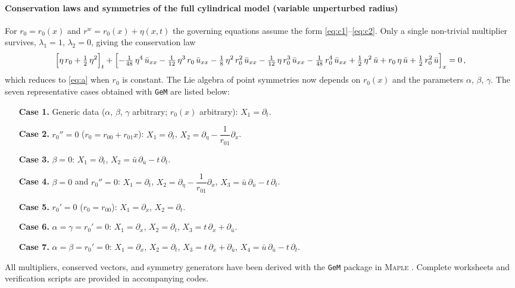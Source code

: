 \documentclass[alpha-refs, 12pt]{wiley-article}
\begin{document}
\paragraph{Conservation laws and symmetries of the full cylindrical model (variable unperturbed radius)}\label{par:variable_r0} For $r_{0}=r_{0}(x)$ and $r^{w}=r_{0}(x)+\eta(x,t)$ the governing equations assume the form \eqref{eq:c1}–\eqref{eq:c2}.  Only a single non-trivial multiplier survives, $\lambda_{1}=1$, $\lambda_{2}=0$, giving the conservation law
\begin{equation}
  \Bigl[\eta\,r_{0}+\tfrac12\,\eta^{2}\Bigr]_{t}
  +\Bigl[
        -\tfrac1{48}\,\eta^{4}\,\bar{u}_{xx}
        -\tfrac1{12}\,\eta^{3}\,r_{0}\,\bar{u}_{xx}
        -\tfrac18\,\eta^{2}\,r_{0}^{2}\,\bar{u}_{xx}
        -\tfrac1{12}\,\eta\,r_{0}^{3}\,\bar{u}_{xx}
        -\tfrac1{48}\,r_{0}^{4}\,\bar{u}_{xx}
        \\[2pt]
        +\tfrac12\,\eta^{2}\,\bar{u}
        +r_{0}\,\eta\,\bar{u}
        +\tfrac12\,r_{0}^{2}\,\bar{u}
  \Bigr]_{x}=0\,,
\end{equation}
which reduces to \eqref{eq:a} when $r_{0}$ is constant. The Lie algebra of point symmetries now depends on $r_{0}(x)$ and the parameters $\alpha$, $\beta$, $\gamma$. The seven representative cases obtained with \texttt{GeM} are listed below:
\begin{itemize}
  \item[\textbf{Case 1.}]
    Generic data ($\alpha$, $\beta$, $\gamma$ arbitrary; $r_{0}(x)$ arbitrary):\;
    $X_{1}=\partial_{t}$.
  \item[\textbf{Case 2.}]
    $r_{0}''=0$ ($r_{0}=r_{00}+r_{01}x$):\;
    $X_{1}=\partial_{t}$,\;
    $X_{2}=\partial_{\eta}-\dfrac{1}{r_{01}}\partial_{x}$.
  \item[\textbf{Case 3.}]
    $\beta=0$:\;
    $X_{1}=\partial_{t}$,\;
    $X_{2}=\bar{u}\,\partial_{\bar{u}}-t\,\partial_{t}$.
  \item[\textbf{Case 4.}]
    $\beta=0$ and $r_{0}''=0$:\;
    $X_{1}=\partial_{t}$,\;
    $X_{2}=\partial_{\eta}-\dfrac{1}{r_{01}}\partial_{x}$,\;
    $X_{3}=\bar{u}\,\partial_{\bar{u}}-t\,\partial_{t}$.
  \item[\textbf{Case 5.}]
    $r_{0}'=0$ ($r_{0}=r_{00}$):\;
    $X_{1}=\partial_{x}$,\;
    $X_{2}=\partial_{t}$.
  \item[\textbf{Case 6.}]
    $\alpha=\gamma=r_{0}'=0$:\;
    $X_{1}=\partial_{x}$,\;
    $X_{2}=\partial_{t}$,\;
    $X_{3}=t\,\partial_{x}+\partial_{\bar{u}}$.
  \item[\textbf{Case 7.}]
    $\alpha=\beta=r_{0}'=0$:\;
    $X_{1}=\partial_{x}$,\;
    $X_{2}=\partial_{t}$,\;
    $X_{3}=t\,\partial_{x}+\partial_{\bar{u}}$,\;
    $X_{4}=\bar{u}\,\partial_{\bar{u}}-t\,\partial_{t}$.
  \end{itemize}
All multipliers, conserved vectors, and symmetry generators have been derived with the \texttt{GeM} package in \textsc{Maple} \cite{Cheviakov2007}. Complete worksheets and verification scripts are provided in accompanying codes.
\end{document}
